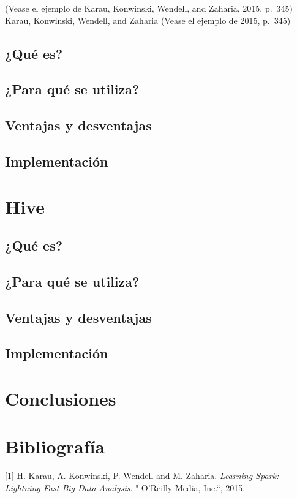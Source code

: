 \documentclass[]{article}
\begin{document}
(Vease el ejemplo de Karau, Konwinski, Wendell, and Zaharia, 2015,
p.~345) Karau, Konwinski, Wendell, and Zaharia (Vease el ejemplo de
2015, p.~345)

\subsection{¿Qué es?}\label{que-es-2}

\subsection{¿Para qué se utiliza?}\label{para-que-se-utiliza-2}

\subsection{Ventajas y desventajas}\label{ventajas-y-desventajas-2}

\subsection{Implementación}\label{implementacion-2}

\section{Hive}\label{hive}

\subsection{¿Qué es?}\label{que-es-3}

\subsection{¿Para qué se utiliza?}\label{para-que-se-utiliza-3}

\subsection{Ventajas y desventajas}\label{ventajas-y-desventajas-3}

\subsection{Implementación}\label{implementacion-3}

\section{Conclusiones}\label{conclusiones}

\section{Bibliografía}\label{bibliografia}

{[}1{]} H. Karau, A. Konwinski, P. Wendell and M. Zaharia.
\emph{Learning Spark: Lightning-Fast Big Data Analysis}. " O'Reilly
Media, Inc.``, 2015.
\end{document}
